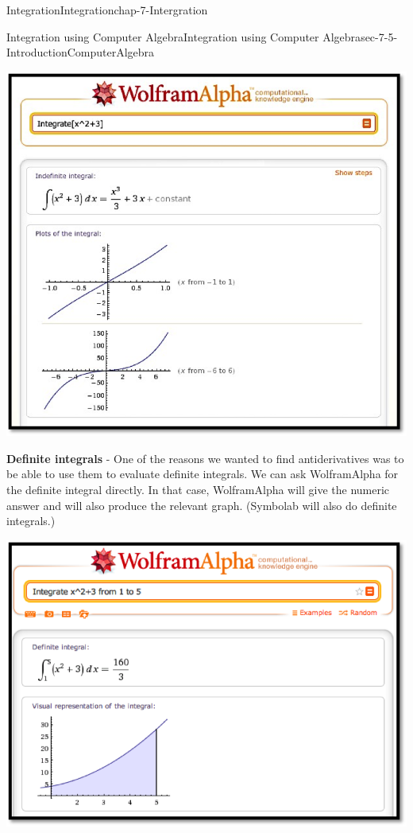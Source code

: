 \documentclass[oneside,10pt,]{book}
\newcommand{\terminology}[1]{\textbf{#1}}
\numberwithin{equation}{section}
\begin{document}
\begin{chapterptx}{Integration}{}{Integration}{}{}{chap-7-Intergration}
\begin{sectionptx}{Integration using Computer Algebra}{}{Integration using Computer Algebra}{}{}{sec-7-5-IntroductionComputerAlgebra}
\begin{sidebyside}{1}{0.05}{0.05}{0}
\begin{sbspanel}{0.9}
\includegraphics[width=1\linewidth]{images/sec7-5-10.png}
\end{sbspanel}%
\end{sidebyside}%
\par
\hypertarget{p-2892}{}%
\terminology{Definite integrals} - One of the reasons we wanted to find antiderivatives was to be able to use them to evaluate definite integrals.  We can ask Wolfram\textbar{}Alpha for the definite integral directly.  In that case, Wolfram\textbar{}Alpha will give the numeric answer and will also produce the relevant graph.  (Symbolab will also do definite integrals.)%
\begin{sidebyside}{1}{0.05}{0.05}{0}%
\begin{sbspanel}{0.9}%
\includegraphics[width=1\linewidth]{images/sec7-5-11.png}

\end{sbspanel}
\end{sidebyside}
\end{sectionptx}
\end{chapterptx}
\end{document}
